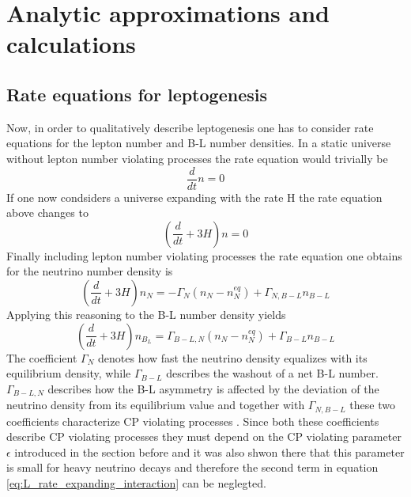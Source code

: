  \chapter{Analytic approximations and calculations}
 
\section{Rate equations for leptogenesis}
Now, in order to qualitatively describe leptogenesis one has to consider rate equations for the lepton number and B-L number densities. In a static universe without lepton number violating processes the rate equation would trivially be
\begin{equation}
	\frac{d}{dt}n=0
	\label{eq:rate_static_nointeraction}
\end{equation}
If one now condsiders a universe expanding with the rate H the rate equation above changes to
\begin{equation}
\left(\frac{d}{dt}+3H\right)n=0
\label{eq:rate_expanding_nointeraction}
\end{equation}
Finally including lepton number violating processes the rate equation one obtains for the neutrino number density is
\begin{equation}
\left(\frac{d}{dt}+3H\right)n_N=-\Gamma_N\left(n_N-n_N^{eq}\right)+\Gamma_{N,B-L}n_{B-L}
\label{eq:L_rate_expanding_interaction}
\end{equation}
Applying this reasoning to the B-L number density yields
\begin{equation}
\left(\frac{d}{dt}+3H\right)n_{B_L}=\Gamma_{B-L,N}\left(n_N-n_N^{eq}\right)+\Gamma_{B-L}n_{B-L}
\label{eq:B-L_rate_expanding_interaction}
\end{equation}
The coefficient $\Gamma_N$ denotes how fast the neutrino density equalizes with its equilibrium density, while $\Gamma_{B-L}$ describes the washout of a net B-L number. $\Gamma_{B-L,N}$ describes how the B-L asymmetry is affected by the deviation of the neutrino density from its equilibrium value and together with $\Gamma_{N,B-L}$ these two coefficients characterize CP violating processes \cite[p. 4]{Bodeker:2013qaa}. Since both these coefficients describe CP violating processes they must depend on the CP violating parameter $\epsilon$ introduced in the section before and it was also shwon there that this parameter is small for heavy neutrino decays and therefore the second term in equation \ref{eq:L_rate_expanding_interaction} can be neglegted. \newline
